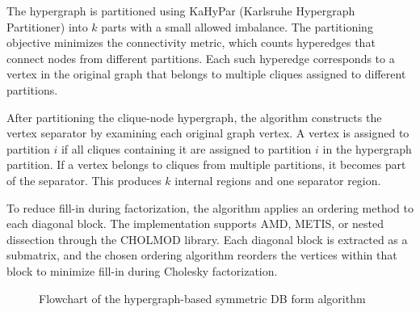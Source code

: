 The hypergraph is partitioned using KaHyPar (Karlsruhe Hypergraph Partitioner) into $k$ parts with a small allowed imbalance. The partitioning objective minimizes the connectivity metric, which counts hyperedges that connect nodes from different partitions. Each such hyperedge corresponds to a vertex in the original graph that belongs to multiple cliques assigned to different partitions.

After partitioning the clique-node hypergraph, the algorithm constructs the vertex separator by examining each original graph vertex. A vertex is assigned to partition $i$ if all cliques containing it are assigned to partition $i$ in the hypergraph partition. If a vertex belongs to cliques from multiple partitions, it becomes part of the separator. This produces $k$ internal regions and one separator region.

To reduce fill-in during factorization, the algorithm applies an ordering method to each diagonal block. The implementation supports AMD, METIS, or nested dissection through the CHOLMOD library. Each diagonal block is extracted as a submatrix, and the chosen ordering algorithm reorders the vertices within that block to minimize fill-in during Cholesky factorization.

\begin{figure}[htbp]
\centering
{}
\caption{Flowchart of the hypergraph-based symmetric DB form algorithm}
\label{fig:hypergraph_flowchart}
\end{figure}

